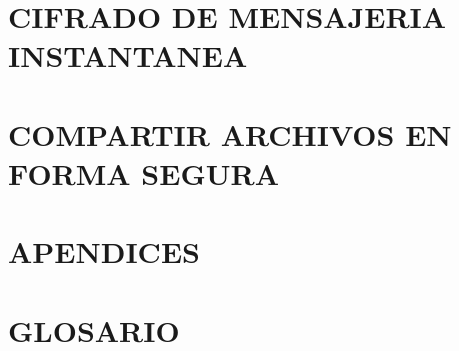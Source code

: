 \documentclass[oribibl,oneside]{scrbook}
\begin{document}
\chapter{CIFRADO DE MENSAJERIA INSTANTANEA}
\clearpage

\graphicspath{{./capitulo_14_COMPARTIR_ARCHIVOS_EN_FORMA_SEGURA/}}
\chapter{COMPARTIR ARCHIVOS EN FORMA SEGURA}
\clearpage

\graphicspath{{./capitulo_15_APENDICES/}}
\chapter{APENDICES}
\clearpage

\clearpage

\clearpage

\graphicspath{{./capitulo_16_GLOSARIO/}}
\chapter{GLOSARIO}
\clearpage

\end{document}
